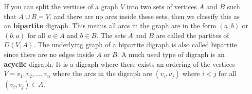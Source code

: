 If you can split the vertices of a graph $V$ into two sets of vertices $A$ and $B$ such that $A\cup B=V$, and there are no arcs inside these sets, then we classify this as an \textbf{bipartite} digraph. 
This means all arcs in the graph are in the form $(a,b)$ or $(b,a)$ for all $a\in A$ and $b\in B$. 
The sets $A$ and $B$ are called the partites of $D(V,A)$. 
The underlying graph of a bipartite digraph is also called bipartite since there are no edges inside $A$ or $B$.
A much used type of digraph is an \textbf{acyclic} digraph. 
It is a digraph where there exists an ordering of the vertices $V={v_1, v_2,\dots , v_n}$ where the arcs in the digraph are $(v_i, v_j)$ where $i<j$ for all $(v_i, v_j)\in A$. 
